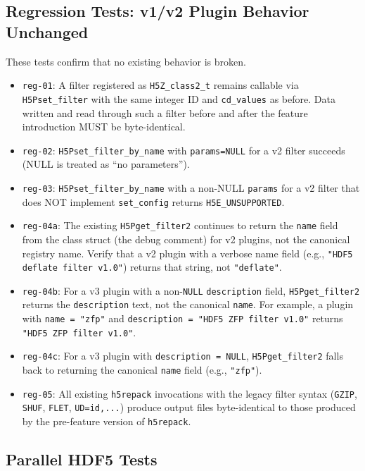 \documentclass[../HDF5_RFC.tex]{subfiles}
\begin{document}
\subsection{Regression Tests: v1/v2 Plugin Behavior Unchanged}
\label{sec:test-regression}

These tests confirm that no existing behavior is broken.

\begin{itemize}
\item \texttt{reg-01}: A filter registered as \texttt{H5Z\_class2\_t} remains callable via
  \texttt{H5Pset\_filter} with the same integer ID and \texttt{cd\_values} as before.
  Data written and read through such a filter before and after the feature
  introduction MUST be byte-identical.
\item \texttt{reg-02}: \texttt{H5Pset\_filter\_by\_name} with \texttt{params=NULL} for a v2 filter
  succeeds (NULL is treated as ``no parameters'').
\item \texttt{reg-03}: \texttt{H5Pset\_filter\_by\_name} with a non-NULL \texttt{params} for a v2 filter
  that does NOT implement \texttt{set\_config} returns \texttt{H5E\_UNSUPPORTED}.
\item \texttt{reg-04a}: The existing \texttt{H5Pget\_filter2} continues to return the
  \texttt{name} field from the class struct (the debug comment) for v2 plugins,
  not the canonical registry name.  Verify that a v2 plugin with a verbose
  name field (e.g., \texttt{"HDF5 deflate filter v1.0"}) returns that string,
  not \texttt{"deflate"}.
\item \texttt{reg-04b}: For a v3 plugin with a non-\texttt{NULL} \texttt{description}
  field, \texttt{H5Pget\_filter2} returns the \texttt{description} text, not the
  canonical \texttt{name}. For example, a plugin with \texttt{name = "zfp"} and
  \texttt{description = "HDF5 ZFP filter v1.0"} returns
  \texttt{"HDF5 ZFP filter v1.0"}.
\item \texttt{reg-04c}: For a v3 plugin with \texttt{description = NULL},
  \texttt{H5Pget\_filter2} falls back to returning the canonical \texttt{name}
  field (e.g., \texttt{"zfp"}).
\item \texttt{reg-05}: All existing \texttt{h5repack} invocations with the legacy filter
  syntax (\texttt{GZIP}, \texttt{SHUF}, \texttt{FLET}, \texttt{UD=id,...}) produce
  output files byte-identical to those produced by the pre-feature version of
  \texttt{h5repack}.
\end{itemize}


\subsection{Parallel HDF5 Tests}
\label{sec:test-parallel}
\end{document}
